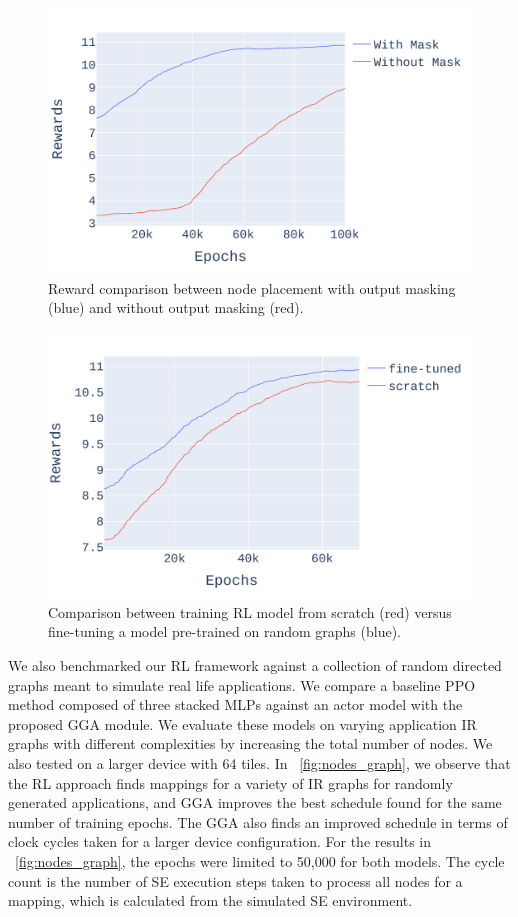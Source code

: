 \begin{figure}[tb]
  \centering
  \includegraphics[width=\linewidth]{fig/ifft_masked_nomask.pdf}
  \caption{Reward comparison between node placement with output masking (blue) and without output masking (red).}
  \label{fig:mask_nomask}
\end{figure}

\begin{figure}[tb]
  \centering
  \includegraphics[width=\linewidth]{fig/pretrain_ifft.pdf}
  \caption{Comparison between training RL model from scratch (red) versus fine-tuning a model pre-trained on random graphs (blue). }
  \label{fig:pretrain_ifft}
\end{figure}

We also benchmarked our RL framework against a collection of random directed graphs meant to simulate real life applications. 
We compare a baseline PPO method composed of three stacked MLPs against an actor model with the proposed GGA module.
We evaluate these models on varying application IR graphs with different complexities by increasing the total number of nodes. 
We also tested on a larger device with 64 tiles.
In \figurename~\ref{fig:nodes_graph}, we observe that the RL approach finds mappings for a variety of IR graphs for randomly generated applications, and GGA improves the best schedule found for the same number of training epochs. 
The GGA also finds an improved schedule in terms of clock cycles taken for a larger device configuration. 
For the results in \figurename~\ref{fig:nodes_graph}, the epochs were limited to 50,000 for both models. 
The cycle count is the number of SE execution steps taken to process all nodes for a mapping, which is calculated from the simulated SE environment. 

